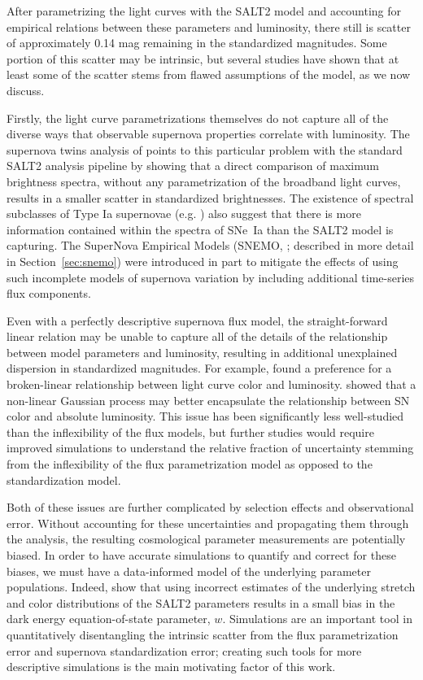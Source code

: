 After parametrizing the light curves with the SALT2 model and accounting for empirical relations between these parameters and luminosity, there still is scatter of approximately 0.14 mag remaining in the standardized magnitudes. Some portion of this scatter may be intrinsic, but several studies have shown that at least some of the scatter stems from flawed assumptions of the model, as we now discuss.

Firstly, the light curve parametrizations themselves do not capture all of the diverse ways that observable supernova properties correlate with luminosity. The supernova twins analysis of \cite{fakhouri_improving_2015} points to this particular problem with the standard SALT2 analysis pipeline by showing that a direct comparison of maximum brightness spectra, without any parametrization of the broadband light curves, results in a smaller scatter in standardized brightnesses. The existence of spectral subclasses of Type Ia supernovae (e.g. \cite{branch_comparative_2006}) also suggest that there is more information contained within the spectra of SNe~Ia than the SALT2 model is capturing. The SuperNova Empirical Models (SNEMO, \cite{saunders_snemo_2018}; described in more detail in Section~\ref{sec:snemo}) were introduced in part to mitigate the effects of using such incomplete models of supernova variation by including additional time-series flux components.

Even with a perfectly descriptive supernova flux model, the straight-forward linear relation may be unable to capture all of the details of the relationship between model parameters and luminosity, resulting in additional unexplained dispersion in standardized magnitudes. For example, \cite{rubin_unity_2015} found a preference for a broken-linear relationship between light curve color and luminosity. \cite{rose_initial_2020} showed that a non-linear Gaussian process may better encapsulate the relationship between SN color and absolute luminosity. This issue has been significantly less well-studied than the inflexibility of the flux models, but further studies would require improved simulations to understand the relative fraction of uncertainty stemming from the inflexibility of the flux parametrization model as opposed to the standardization model.

Both of these issues are further complicated by selection effects and observational error. Without accounting for these uncertainties and propagating them through the analysis, the resulting cosmological parameter measurements are potentially biased. In order to have accurate simulations to quantify and correct for these biases, we must have a data-informed model of the underlying parameter populations. Indeed, \cite{scolnic_measuring_2016} show that using incorrect estimates of the underlying stretch and color distributions of the SALT2 parameters results in a small bias in the dark energy equation-of-state parameter, $w$. Simulations are an important tool in quantitatively disentangling the intrinsic scatter from the flux parametrization error and supernova standardization error; creating such tools for more descriptive simulations is the main motivating factor of this work.

